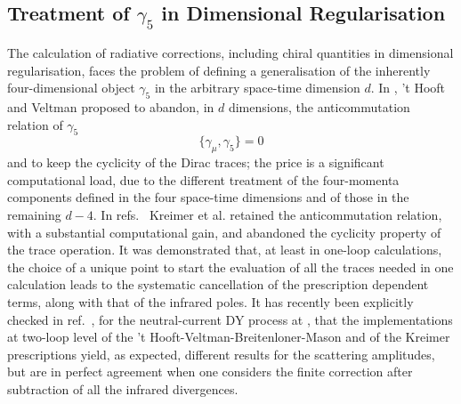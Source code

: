 \documentclass[11pt,a4paper]{article}
\begin{document}
\subsection{Treatment of \texorpdfstring{$\gamma_5$}{g5} in Dimensional Regularisation}
\label{sec:gamma5}

The calculation of radiative corrections, including chiral quantities in dimensional regularisation, faces the problem of defining a generalisation of
the inherently four-dimensional object  $\gamma_5$ in the arbitrary space-time dimension $d$.
% 
%
In \cite{'tHooft:1972fi}, 't Hooft and Veltman proposed to abandon, in $d$ dimensions, the anticommutation relation of $\gamma_5$
\begin{equation}
 \{\gamma_\mu,\gamma_5\} = 0
\end{equation}
and to keep the cyclicity of the Dirac traces; the price is a significant
computational load, due to the different treatment of the four-momenta
components defined in the four space-time dimensions and of those
in the remaining $d-4$.
In refs.~\cite{Kreimer:1989ke,Korner:1991sx}
Kreimer et al. retained the anticommutation relation, with a substantial computational gain, and abandoned the cyclicity property of the trace operation.
It was demonstrated that, at least in one-loop calculations, the choice of
a unique point to start the evaluation of  all the traces needed in one calculation
leads to the systematic cancellation of the prescription dependent terms,
along with that of the infrared poles.
It has recently been explicitly checked in ref.~\cite{Heller:2020owb},
for the neutral-current DY process at \oaas,
that the implementations at two-loop level of the 't Hooft-Veltman-Breitenloner-Mason and of the Kreimer prescriptions
yield, as expected, different results for the scattering amplitudes,
but are in perfect agreement when one considers the finite correction
after subtraction of all the infrared divergences.
%
\end{document}
